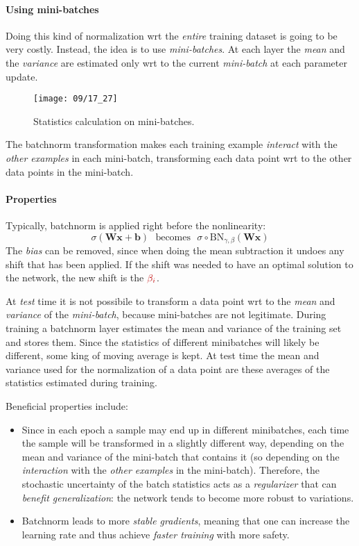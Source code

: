 \paragraph{Using mini-batches}
Doing this kind of normalization wrt the \emph{entire} training dataset is going to 
be very costly. Instead, the idea is to use \emph{mini-batches}. At 
each layer the \emph{mean} and the \emph{variance} are estimated only wrt to the current \emph{mini-batch}
at each parameter update.
\begin{figure}[H]
    \centering
    \texttt{[image: 09/17\_27]}
    \caption{Statistics calculation on mini-batches.}	
\end{figure}
The batchnorm transformation makes each training example \emph{interact} with the \emph{other examples} in each mini-batch,
transforming each data point wrt to the other data points in the mini-batch.

\paragraph{Properties}
Typically, batchnorm is applied right before the nonlinearity:
\begin{equation}
    \sigma(\mathbf{Wx}+\mathbf{b}) ~~~\textrm{becomes}~~~ \sigma \circ \mathrm{BN}_{\gamma,\beta}(\mathbf{Wx})
\end{equation}  
The \emph{bias} can be removed, since when doing the mean subtraction it undoes 
any shift that has been applied. If the shift was needed to have an optimal solution
to the network, the new shift is the $\color{darkred}\beta_i$.

At \emph{test} time it is not possibile to transform a data point wrt to the \emph{mean} and \emph{variance} of the \emph{mini-batch}, because mini-batches are not legitimate. During training a batchnorm layer estimates the mean and variance of the training set and stores them. Since the statistics of different minibatches will likely be different, some king of moving average is kept. At test time the mean and variance used for the normalization of a data point are these averages of the statistics estimated during training.

Beneficial properties include:
\begin{itemize}
    \item Since in each epoch a sample may end up in different minibatches, each time the sample will be transformed in a slightly different way, depending on the mean and 
    variance of the mini-batch that contains it (so depending on the \emph{interaction} with the \emph{other examples} in the mini-batch). 
    Therefore, the stochastic uncertainty of the batch statistics acts as a \emph{regularizer} that can \emph{benefit generalization}: the network tends to become more robust to variations.
    
    \item Batchnorm leads to more \emph{stable gradients}, meaning that one can increase the learning rate and thus achieve \emph{faster training} with more safety.
\end{itemize}

